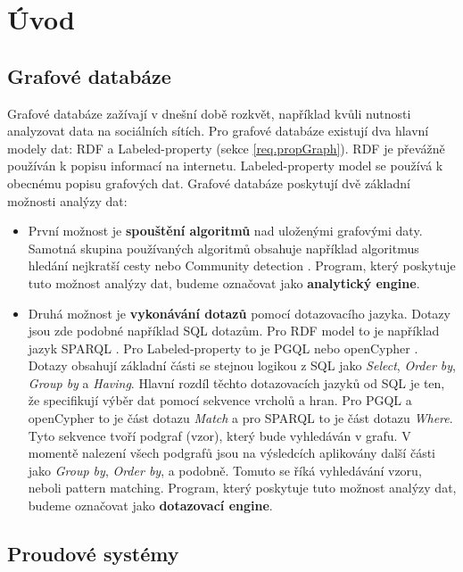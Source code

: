 \chapter*{Úvod}

\section*{Grafové databáze}

Grafové databáze zažívají v dnešní době rozkvět, například kvůli nutnosti analyzovat data na sociálních sítích.
Pro grafové databáze existují dva hlavní modely dat: RDF \citep{rdf} a Labeled-property (sekce \ref{req.propGraph}).
RDF je převážně používán k popisu informací na internetu. 
Labeled-property model se používá k obecnému popisu grafových dat.
Grafové databáze poskytují dvě základní možnosti analýzy dat:
\begin{itemize}

\item
První možnost je \textbf{spouštění algoritmů} nad uloženými grafovými daty.
Samotná skupina používaných algoritmů obsahuje například algoritmus hledání nejkratší cesty nebo Community detection \citep[str. 115]{graphAlg}.
Program, který poskytuje tuto možnost analýzy dat, budeme označovat jako \textbf{analytický engine}.

\item
Druhá možnost je \textbf{vykonávání dotazů} pomocí dotazovacího jazyka.
Dotazy jsou zde podobné například SQL dotazům.
Pro RDF model to je například jazyk SPARQL \citep{sparql}.
Pro Labeled-property to je PGQL \citep{pgql} nebo openCypher \citep{openCypher}.
Dotazy obsahují základní části se stejnou logikou z SQL jako \textit{Select}, \textit{Order by}, \textit{Group by} a \textit{Having}.
Hlavní rozdíl těchto dotazovacích jazyků od SQL je ten, že specifikují výběr dat pomocí sekvence vrcholů a hran.
Pro PGQL a openCypher to je část dotazu \textit{Match} a pro SPARQL to je část dotazu \textit{Where}.
Tyto sekvence tvoří podgraf (vzor), který bude vyhledáván v grafu.
V momentě nalezení všech podgrafů jsou na výsledcích aplikovány další části jako \textit{Group by}, \textit{Order by}, a podobně.
Tomuto se říká vyhledávání vzoru, neboli pattern matching.
Program, který poskytuje tuto možnost analýzy dat, budeme označovat jako \textbf{dotazovací engine}.
\end{itemize}

\section*{Proudové systémy}


